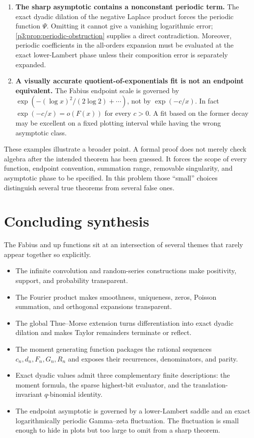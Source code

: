 \documentclass[11pt]{article}
\numberwithin{equation}{section}
\theoremstyle{definition}
\theoremstyle{remark}
\begin{document}
\begin{enumerate}[label=\textbf{\arabic*.},leftmargin=*]
\item \textbf{The sharp asymptotic contains a nonconstant periodic term.}
The exact dyadic dilation of the negative Laplace product forces the
periodic function $\Psi$.  Omitting it cannot give a vanishing logarithmic
error; \cref{p3:prop:periodic-obstruction} supplies a direct contradiction.
Moreover, periodic coefficients in the all-orders expansion must be evaluated
at the exact lower-Lambert phase unless their composition error is separately
expanded.

\item \textbf{A visually accurate quotient-of-exponentials fit is not an
endpoint equivalent.}
The Fabius endpoint scale is governed by
$\exp(-({\log x})^2/(2\log2)+\cdots)$, not by $\exp(-c/x)$.  In fact
$\exp(-c/x)=o(F(x))$ for every $c>0$.  A fit based on the former decay may be
excellent on a fixed plotting interval while having the wrong asymptotic
class.
\end{enumerate}

These examples illustrate a broader point.  A formal proof does not merely
check algebra after the intended theorem has been guessed.  It forces the
scope of every function, endpoint convention, summation range, removable
singularity, and asymptotic phase to be specified.  In this problem those
``small'' choices distinguish several true theorems from several false ones.

\section{Concluding synthesis}\label{p3:sec:conclusion}

The Fabius and up functions sit at an intersection of several themes that
rarely appear together so explicitly.

\begin{itemize}[leftmargin=*]
\item The infinite convolution and random-series constructions make
positivity, support, and probability transparent.
\item The Fourier product makes smoothness, uniqueness, zeros, Poisson
summation, and orthogonal expansions transparent.
\item The global Thue--Morse extension turns differentiation into exact
dyadic dilation and makes Taylor remainders terminate or reflect.
\item The moment generating function packages the rational sequences
$c_n,d_n,F_n,G_n,R_n$ and exposes their recurrences, denominators, and parity.
\item Exact dyadic values admit three complementary finite descriptions: the
moment formula, the sparse highest-bit evaluator, and the translation-invariant
$q$-binomial identity.
\item The endpoint asymptotic is governed by a lower-Lambert saddle and an
exact logarithmically periodic Gamma--zeta fluctuation.  The fluctuation is
small enough to hide in plots but too large to omit from a sharp theorem.
\end{itemize}
\end{document}

